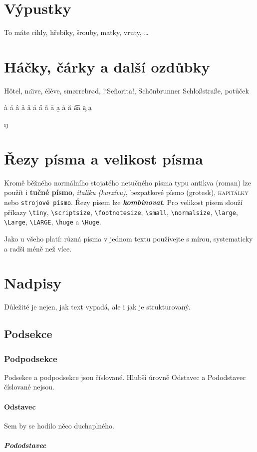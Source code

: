 \documentclass{article}
\begin{document}
	\section{Výpustky}
		To máte cihly, hřebíky, šrouby, matky, vruty, \ldots

	\section{Háčky, čárky a další ozdůbky}
	\label{sec:akcenty}
		H\^otel,
		na\"\i ve, 
		\'el\`eve, 
		sm\o rrebr\o d, 
		!‘Se\~norita!,	
		Sch\"onbrunner Schlo\ss stra\ss e,
		pot\r u\v cek
		
		\`a \'a \^a \r a \v a \"a  \H a
		\~a \=a \b a \.a \u a \t{aa} \c a \d a

		\i \j
		
	\section{Řezy písma a velikost písma}
		Kromě běžného normálního stojatého netučného písma typu antikva (roman) lze použít i \textbf{tučné písmo}, \textit{italiku (kurzívu)}, \textsf{bezpatkové písmo (grotesk)}, \textsc{kapitálky} nebo \texttt{strojové písmo}.
		Řezy písem lze \textit{\textbf{kombinovat}}.
		Pro velikost písem slouží příkazy
		{\tiny\verb+\tiny+}, 
		{\scriptsize\verb+\scriptsize+},
		{\footnotesize\verb+\footnotesize+},
		{\small\verb+\small+},
		{\normalsize\verb+\normalsize+},
		{\large\verb+\large+},
		{\Large\verb+\Large+},
		{\LARGE\verb+\LARGE+},
		{\huge\verb+\huge+} a
		{\Huge\verb+\Huge+}.

		Jako u všeho platí: různá písma v jednom textu používejte s mírou, systematicky a radši méně než více.

	\section{Nadpisy}
		Důležité je nejen, jak text vypadá, ale i jak je strukturovaný.
		\subsection{Podsekce}
			\subsubsection{Podpodsekce}	
				Podsekce a podpodsekce jsou číslované.
				Hlubší úrovně Odstavec a Pododstavec číslované nejsou.
				\paragraph{Odstavec}
					Sem by se hodilo něco duchaplného.
					\subparagraph{Pododstavec}
\end{document}
